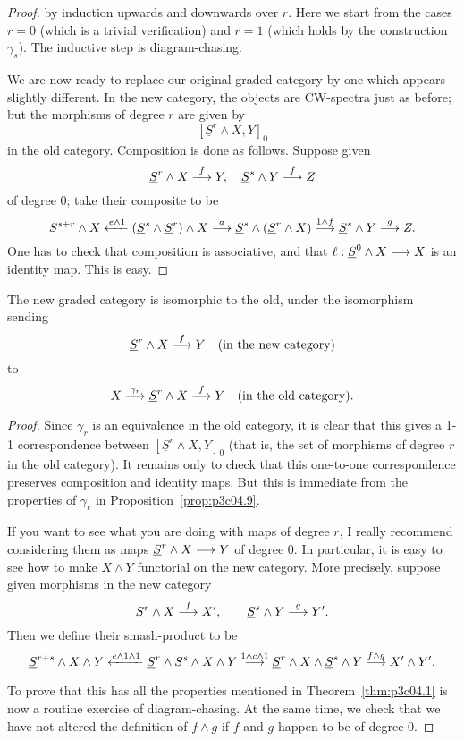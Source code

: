 \documentclass[../main]{subfiles}
\begin{document}
\begin{proof}
by induction upwards and downwards over $r$. Here we start from the cases $r = 0$ (which is a trivial verification) and $r = 1$ (which holds by the construction $\gamma_s$). The inductive step is diagram-chasing.

We are now ready to replace our original graded category by one which appears slightly different. In the new category, the objects are CW-spectra just as before; but the morphisms of degree $r$ are given by $$[\underline S^r \wedge X, Y]_0$$ in the old category. Composition is done as follows. Suppose given $$\underline S^r \wedge X \overset{f}{\longrightarrow} Y, \quad \underline S^s \wedge Y \overset{f}{\longrightarrow} Z$$ of degree 0; take their composite to be $$S^{s + r} \wedge X \xleftarrow{e \wedge 1} (\underline S^s \wedge \underline S^r) \wedge X \overset{a}{\longrightarrow} \underline S^s \wedge (\underline S^r \wedge X) \overset{1 \wedge f}{\longrightarrow} \underline S^s \wedge Y \overset{g}{\longrightarrow} Z.$$ One has to check that composition is associative, and that $\ell : \underline S^0 \wedge X \overset{}{\longrightarrow} X$ is an identity map. This is easy.
\end{proof}

\begin{proposition}\label{prop:p3ch04.10}
The new graded category is isomorphic to the old, under the isomorphism sending $$\underline S^r \wedge X \overset{f}{\longrightarrow} Y \quad \text {(in the new category)}$$ to $$X \overset{\gamma_r}{\longrightarrow} \underline S^r \wedge X \overset{f}{\longrightarrow} Y \quad \text{(in the old category).}$$
\end{proposition}

\begin{proof}
Since $\gamma_r$ is an equivalence in the old category, it is clear that this gives a 1-1 correspondence between $[\underline S^r \wedge X, Y]_0$ (that is, the set of morphisms of degree $r$ in the old category). It remains only to check that this one-to-one correspondence preserves composition and identity maps. But this is immediate from the properties of $\gamma_r$ in Proposition~\ref{prop:p3c04.9}.

If you want to see what you are doing with maps of degree $r$, I really recommend considering them as maps $\underline S^r \wedge X \overset{}{\longrightarrow} Y$ of degree $0$. In particular, it is easy to see how to make $X \wedge Y$ functorial on the new category. More precisely, suppose given morphisms in the new category $$S^r \wedge X \overset{f}{\longrightarrow} X', \qquad \underline S^s \wedge Y \overset{g}{\longrightarrow} Y'.$$ Then we define their smash-product to be $$\underline S^{r + s} \wedge X \wedge Y \xleftarrow{e \wedge 1 \wedge 1} \underline S^r \wedge S^s \wedge X \wedge Y \overset{1 \wedge c \wedge 1}{\longrightarrow} \underline S^r \wedge X \wedge \underline S^s \wedge Y \overset{f \wedge g}{\longrightarrow} X' \wedge Y'.$$

To prove that this has all the properties mentioned in Theorem~\ref{thm:p3c04.1} is now a routine exercise of diagram-chasing. At the same time, we check that we have not altered the definition of $f \wedge g$ if $f$ and $g$ happen to be of degree $0$. 
\end{proof}
\end{document}
